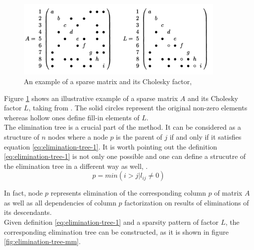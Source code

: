 \begin{figure}[htpb]
  \centering
  \includegraphics[width=0.9\textwidth]{figures/chapter-2/sparsity-pattern-example-mm.png}
\caption{An example of a sparse matrix and its Cholesky factor, \cite{mult-frontal-original:2}}
\label{fig:sparsity-pattern-example-mm}
\end{figure}


Figure \ref{fig:sparsity-pattern-example-mm} shows an illustrative example of a sparse matrix $A$ and its Cholesky factor $L$, taking from \cite{mult-frontal-original:2}. The solid circles represent the original non-zero elements whereas hollow ones define fill-in elements of $L$. \\


The elimination tree is a crucial part of the method. It can be considered as a structure of $n$ nodes where a node $p$ is the parent of $j$ if and only if it satisfies equation \ref{eq:elimination-tree-1}. It is worth pointing out the definition \ref{eq:elimination-tree-1} is not only one possible and one can define a strucutre of the elimination tree in a different way as well, \cite{mult-frontal-original:2}.\\%

\begin{equation} \label{eq:elimination-tree-1}
	p = min(i > j | l_{ij} \neq 0)
\end{equation}


In fact, node $p$ represents elimination of the corresponding column $p$ of matrix $A$ as well as all dependencies of column $p$ factorization on results of eliminations of its descendants.\\


Given definition \ref{eq:elimination-tree-1} and a sparsity pattern of factor $L$, the corresponding elimination tree can be constructed, as it is shown in figure \ref{fig:elimination-tree-mm}.\\


